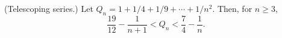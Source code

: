 (Telescoping series.) Let $Q_n = 1 + 1/4 + 1/9 + \cdots + 1/n^2$. Then, for $n \geq 3$,
\[ \frac{19}{12} - \frac{1}{n + 1} < Q_n < \frac{7}{4} - \frac{1}{n}. \]
